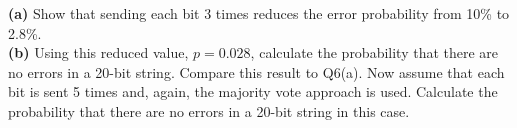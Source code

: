 \documentclass[12pt]{article}
\begin{document}
{\bf(a)} Show that sending each bit 3 times reduces the error probability from 10\% to 2.8\%. \quad\\ {\bf(b)} Using this reduced value, $p=0.028$, calculate the probability that there are no errors in a 20-bit string. Compare this result to Q6(a).  Now assume that each bit is sent 5 times and, again, the majority vote approach is used. Calculate the probability that there are no errors in a 20-bit string in this case. %
\end{document}
